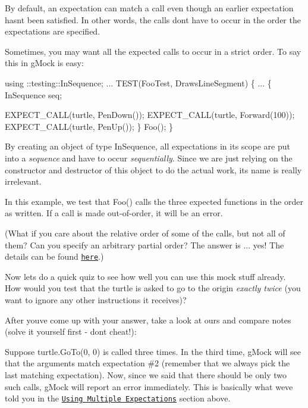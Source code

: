 By default, an expectation can match a call even though an earlier expectation hasn\textquotesingle{}t been satisfied. In other words, the calls don\textquotesingle{}t have to occur in the order the expectations are specified.

Sometimes, you may want all the expected calls to occur in a strict order. To say this in g\+Mock is easy\+:


\begin{DoxyCode}
using ::testing::InSequence;
...
TEST(FooTest, DrawsLineSegment) \{
  ...
  \{
    InSequence seq;

    EXPECT\_CALL(turtle, PenDown());
    EXPECT\_CALL(turtle, Forward(100));
    EXPECT\_CALL(turtle, PenUp());
  \}
  Foo();
\}
\end{DoxyCode}


By creating an object of type {\ttfamily In\+Sequence}, all expectations in its scope are put into a {\itshape sequence} and have to occur {\itshape sequentially}. Since we are just relying on the constructor and destructor of this object to do the actual work, its name is really irrelevant.

In this example, we test that {\ttfamily Foo()} calls the three expected functions in the order as written. If a call is made out-\/of-\/order, it will be an error.

(What if you care about the relative order of some of the calls, but not all of them? Can you specify an arbitrary partial order? The answer is ... yes! The details can be found \href{gmock_cook_book.md#OrderedCalls}{\tt here}.)

Now let\textquotesingle{}s do a quick quiz to see how well you can use this mock stuff already. How would you test that the turtle is asked to go to the origin {\itshape exactly twice} (you want to ignore any other instructions it receives)?

After you\textquotesingle{}ve come up with your answer, take a look at ours and compare notes (solve it yourself first -\/ don\textquotesingle{}t cheat!)\+:




Suppose {\ttfamily turtle.\+Go\+To(0, 0)} is called three times. In the third time, g\+Mock will see that the arguments match expectation \#2 (remember that we always pick the last matching expectation). Now, since we said that there should be only two such calls, g\+Mock will report an error immediately. This is basically what we\textquotesingle{}ve told you in the \href{#MultiExpectations}{\tt Using Multiple Expectations} section above.

